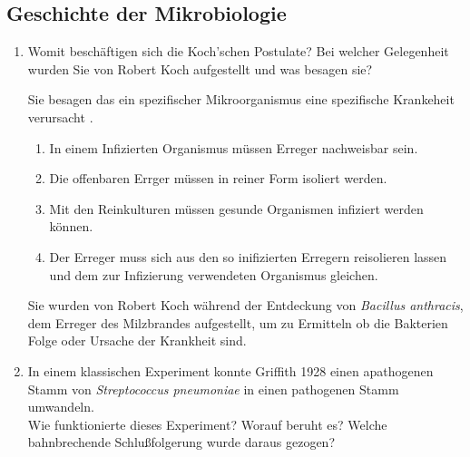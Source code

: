 \subsection*{Geschichte der Mikrobiologie}
\begin{enumerate}
	\item Womit beschäftigen sich die Koch’schen Postulate?
	Bei welcher Gelegenheit wurden Sie von Robert Koch aufgestellt und was besagen sie? \hfill \vspace{4mm}

	Sie besagen das ein spezifischer Mikroorganismus eine spezifische Krankeheit verursacht \citep[S.15]{brock}.
	
	\begin{enumerate}[label=\arabic*)]
		\item In einem Infizierten Organismus müssen Erreger nachweisbar sein.
		\item Die offenbaren Errger müssen in reiner Form isoliert werden.
		\item Mit den Reinkulturen müssen gesunde Organismen infiziert werden können.
		\item Der Erreger muss sich aus den so inifizierten Erregern reisolieren lassen
					und dem zur Infizierung verwendeten Organismus gleichen.
	\end{enumerate}
	Sie wurden von Robert Koch während der Entdeckung von \emph{Bacillus anthracis},
	dem Erreger des Milzbrandes aufgestellt,
	um zu Ermitteln ob die Bakterien Folge oder Ursache der Krankheit sind.	
	

	\item In einem klassischen Experiment konnte Griffith 1928 einen apathogenen Stamm von
	\emph{Streptococcus pneumoniae} in einen pathogenen Stamm umwandeln.\\
	Wie funktionierte dieses Experiment? Worauf beruht es? 
	Welche bahnbrechende Schlußfolgerung wurde daraus gezogen? \hfill \vspace{4mm}
	

\end{enumerate}
